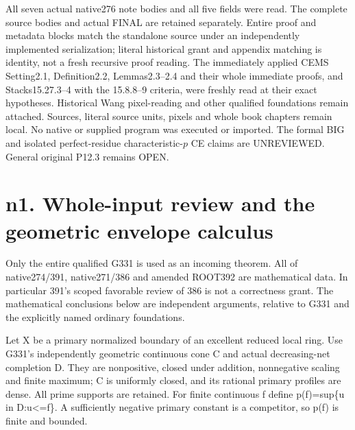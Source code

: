 \documentclass[11pt]{article}
\begin{document}
All seven actual native276 note bodies and all five fields were read.
The complete source bodies and actual FINAL are retained separately.
Entire proof and metadata blocks match the standalone source under an
independently implemented serialization; literal historical grant and
appendix matching is identity, not a fresh recursive proof reading.
The immediately applied CEMS Setting2.1, Definition2.2, Lemmas2.3--2.4
and their whole immediate proofs, and Stacks15.27.3--4 with the
15.8.8--9 criteria, were freshly read at their exact hypotheses.
Historical Wang pixel-reading and other qualified foundations remain
attached. Sources, literal source units, pixels and whole book chapters
remain local. No native or supplied program was executed or imported.
The formal BIG and isolated perfect-residue characteristic-$p$ CE
claims are UNREVIEWED. General original P12.3 remains OPEN.
\begin{abstract}
We prove actual BIG completed-diagonal restriction and Jacobian-corrected
subadditivity for complete normal characteristic-p local rings with perfect
residue field, without finite type, CM or algebraizability assumptions.
A direct common test-element construction supplies the BIG framework and
arbitrarily late tails; a formal block Jacobian proves generic-diagonal
regularity. Model completion and finite ordinary differentials extend the
correction to actual projective models. Canonical Fitting flattening,
relative Koszul generation and primary trace corrections then prove the
entire isolated formal continuous-envelope theorem on all semivaluation
supports. Qualified G331 supplies the independently geometric cone.
The unchanged general original P12.3 remains incomplete: candidate=false.
The source is standalone, deliberately uncompiled and unpublished.
\end{abstract}
\tableofcontents
\newpage
\section{n1. Whole-input review and the geometric envelope calculus}

Only the entire qualified G331 is used as an incoming theorem. All of native274/391, native271/386 and amended ROOT392 are mathematical data. In particular 391's scoped favorable review of 386 is not a correctness grant. The mathematical conclusions below are independent arguments, relative to G331 and the explicitly named ordinary foundations.

Let X be a primary normalized boundary of an excellent reduced local ring. Use G331's independently geometric continuous cone C and actual decreasing-net completion D. They are nonpositive, closed under addition, nonnegative scaling and finite maximum; C is uniformly closed, and its rational primary profiles are dense. All prime supports are retained. For finite continuous f define p(f)=sup\{u in D:u<=f\}. A sufficiently negative primary constant is a competitor, so p(f) is finite and bounded.
\end{document}
